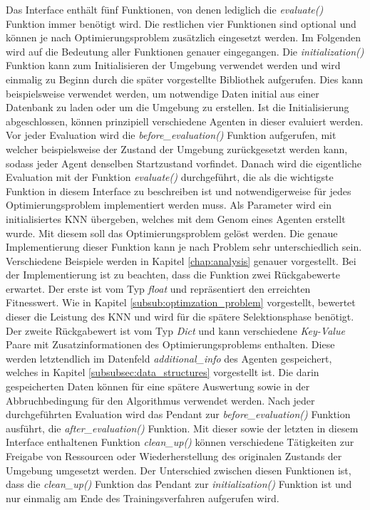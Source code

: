 Das Interface enthält fünf Funktionen, von denen lediglich die \emph{evaluate()} Funktion immer benötigt wird. Die restlichen vier Funktionen sind optional und können je nach Optimierungsproblem zusätzlich eingesetzt werden. Im Folgenden wird auf die Bedeutung aller Funktionen genauer eingegangen. Die \emph{initialization()} Funktion kann zum Initialisieren der Umgebung verwendet werden und wird einmalig zu Beginn durch die später vorgestellte Bibliothek aufgerufen. Dies kann beispielsweise verwendet werden, um notwendige Daten initial aus einer Datenbank zu laden oder um die Umgebung zu erstellen. Ist die Initialisierung abgeschlossen, können prinzipiell verschiedene Agenten in dieser evaluiert werden. Vor jeder Evaluation wird die \emph{before\_evaluation()} Funktion aufgerufen, mit welcher beispielsweise der Zustand der Umgebung zurückgesetzt werden kann, sodass jeder Agent denselben Startzustand vorfindet. Danach wird die eigentliche Evaluation mit der Funktion \emph{evaluate()} durchgeführt, die als die wichtigste Funktion in diesem Interface zu beschreiben ist und notwendigerweise für jedes Optimierungsproblem implementiert werden muss. Als Parameter wird ein initialisiertes \ac{KNN} übergeben, welches mit dem Genom eines Agenten erstellt wurde. Mit diesem soll das Optimierungsproblem gelöst werden. Die genaue Implementierung dieser Funktion kann je nach Problem sehr unterschiedlich sein. Verschiedene Beispiele werden in Kapitel \ref{chap:analysis} genauer vorgestellt. Bei der Implementierung ist zu beachten, dass die Funktion zwei Rückgabewerte erwartet. Der erste ist vom Typ \emph{float} und repräsentiert den erreichten Fitnesswert. Wie in Kapitel \ref{subsub:optimzation_problem} vorgestellt, bewertet dieser die Leistung des \ac{KNN} und wird für die spätere Selektionsphase benötigt. Der zweite Rückgabewert ist vom Typ \emph{Dict} und kann verschiedene \emph{Key-Value} Paare mit Zusatzinformationen des Optimierungsproblems enthalten. Diese werden letztendlich im Datenfeld \emph{additional\_info} des Agenten gespeichert, welches in Kapitel \ref{subsubsec:data_structures} vorgestellt ist. Die darin gespeicherten Daten können für eine spätere Auswertung sowie in der Abbruchbedingung für den Algorithmus verwendet werden. Nach jeder durchgeführten Evaluation wird das Pendant zur \emph{before\_evaluation()} Funktion ausführt, die \emph{after\_evaluation()} Funktion.  Mit dieser sowie der letzten in diesem Interface enthaltenen Funktion \emph{clean\_up()} können verschiedene Tätigkeiten zur Freigabe von Ressourcen oder Wiederherstellung des originalen Zustands der Umgebung umgesetzt werden. Der Unterschied zwischen diesen Funktionen ist, dass die \emph{clean\_up()} Funktion das Pendant zur \emph{initialization()} Funktion ist und nur einmalig am Ende des Trainingsverfahren aufgerufen wird. 
 
